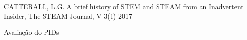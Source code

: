 \documentclass[
12pt,		%
openright,	%
twoside,  %
a4paper,			%
chapter=TITLE,		%
english,			%
french,				%
spanish,			%
brazil				%
]{USPSC-classe/USPSC}
\begin{document}
\begin{flushleft}
\begin{flushleft}
\begin{flushleft}
\begin{flushleft}
\begin{flushleft}
\begin{flushleft}
\begin{flushleft}
\begin{flushleft}
\begin{flushleft}
[CATTERALL, 2017] CATTERALL, L.G. A brief history of STEM and STEAM from an Inadvertent Insider, The STEAM Journal, V 3(1) 2017
\end{flushleft}


\end{flushleft}


\end{flushleft}


\end{flushleft}


\end{flushleft}


\end{flushleft}


\end{flushleft}


\end{flushleft}


\end{flushleft}


\begin{flushleft}
\begin{flushleft}
\begin{flushleft}
\begin{flushleft}
\begin{flushleft}
\begin{flushleft}
\begin{flushleft}
\begin{flushleft}
\begin{flushleft}
[CGEE, 2010] Avalia\c{c}\~ao do PIDs
\end{flushleft}


\end{flushleft}


\end{flushleft}


\end{flushleft}


\end{flushleft}


\end{flushleft}


\end{flushleft}


\end{flushleft}


\end{flushleft}
\end{document}
